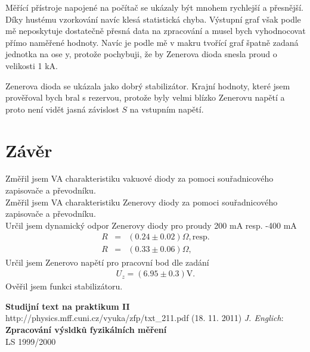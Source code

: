 \documentclass[a4paper,12pt]{article}
\begin{document}
Měřící přístroje napojené na počítač se ukázaly být mnohem rychlejší a přesnější. Díky hustému vzorkování navíc klesá 
statistická chyba. Výstupní graf však podle mě neposkytuje dostatečně přesná data na zpracování a musel bych vyhodnocovat přímo 
naměřené hodnoty. Navíc je podle mě v makru tvořící graf špatně zadaná jednotka na ose y, protože pochybuji, že by Zenerova dioda snesla 
proud o velikosti 1 kA.

Zenerova dioda se ukázala jako dobrý stabilizátor. Krajní hodnoty, které jsem prověřoval bych bral s rezervou, protože byly velmi blízko 
Zenerovu napětí a proto není vidět jasná závislost $S$ na vstupním napětí.

\section{Závěr}
Změřil jsem VA charakteristiku vakuové diody za pomoci souřadnicového zapisovače a převodníku. \\
Změřil jsem VA charakteristiku Zenerovy diody za pomoci souřadnicového zapisovače a převodníku. \\
Určil jsem dynamický odpor Zenerovy diody pro proudy 200 mA resp. -400 mA
\begin{eqnarray}
R&=&(0.24\pm0.02)\Omega,\mbox{resp.} \\
R&=&(0.33\pm0.06)\Omega,
\end{eqnarray}
Určil jsem Zenerovo napětí pro pracovní bod dle zadání
\begin{eqnarray}
U_z=(6.95\pm0.3)\mbox{V}.
\end{eqnarray}
Ověřil jsem funkci stabilizátoru.

\begin{thebibliography}{5}
	 \textbf{Studijní text na praktikum II} \\http://physics.mff.cuni.cz/vyuka/zfp/txt\_211.pdf (18. 11. 2011)
     \emph{J. Englich}: \textbf{Zpracování výsldků fyzikálních měření} \\ LS 1999/2000
\end{thebibliography}
\end{document}
